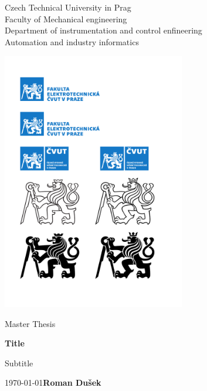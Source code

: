 \documentclass[a4paper, twoside]{article}
\begin{document}
\begin{titlepage}
    \begin{center}
        \vspace*{1cm}
        
        \LARGE
        Czech Technical University in Prag\\[0.1cm]
       	Faculty of Mechanical engineering\\[0.4cm]
		\Large
        Department of instrumentation and control enfineering\\[0.25cm]
        \large
        Automation and industry informatics\\

		\vfill
            
        \includegraphics[width=0.6\textwidth]{lion_white}
                    
        \vfill
        \Large
        Master Thesis

        \vspace{0.8cm}           

        \Huge
        \textbf{Title}
            
        \vspace{0.5cm}
        \LARGE
        Subtitle
        \vspace{3cm}

        \today \hfill \textbf{Roman Dušek}
    \end{center}
\end{titlepage}
\newpage
\tableofcontents
\newpage
\printnomenclature
\newpage
{}%
%
%
%
%
%
%
\end{document}
